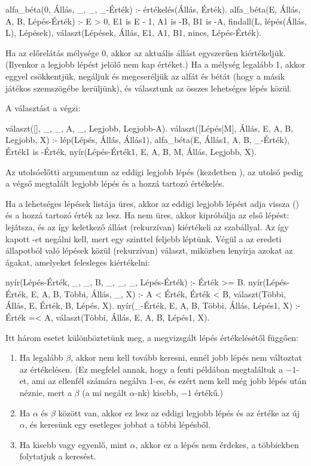 \begin{program}
alfa_béta(0, Állás, _, _, _-Érték) :-
    értékelés(Állás, Érték).
alfa_béta(E, Állás, A, B, Lépés-Érték) :-
    E > 0, E1 is E - 1,
    A1 is -B, B1 is -A,
    findall(L, lépés(Állás, L), Lépések),
    választ(Lépések, Állás, E1, A1, B1,
            nincs, Lépés-Érték).
\end{program}

Ha az előrelátás mélysége 0, akkor az aktuális
állást egyszerűen kiértékeljük. (Ilyenkor a legjobb
lépést jelölő  nem kap értéket.) Ha a
mélység legalább 1, akkor eggyel csökkentjük,
negáljuk és megcseréljük az alfát és bétát (hogy a
másik játékos szemszögébe kerüljünk), és választunk
az összes lehetséges lépés közül.

A választást a  végzi:
\begin{program}
választ([], _, _, A, _, Legjobb, Legjobb-A).
választ([Lépés|M], Állás, E, A, B, Legjobb, X) :-
    lép(Lépés, Állás, Állás1),
    alfa_béta(E, Állás1, A, B, _-Érték),
    Érték1 is -Érték,
    nyír(Lépés-Érték1, E, A, B, M, Állás,
         Legjobb, X).
\end{program}

Az utolsóelőtti argumentum az eddigi legjobb lépés
(kezdetben ), az utolsó pedig a végső
megtalált legjobb lépés és a hozzá tartozó
értékelés.

Ha a lehetséges lépések listája üres, akkor az
eddigi legjobb lépést adja vissza () és
a hozzá tartozó érték az  lesz. Ha nem
üres, akkor kipróbálja az első lépést: lejátsza, és
az így keletkező állást (rekurzívan) kiértékeli az
 szabállyal. Az így kapott
-et negálni kell, mert egy szinttel
feljebb léptünk. Végül a  az eredeti
 állapotból való lépések közül
(rekurzívan) választ, miközben lenyírja azokat az
ágakat, amelyeket felesleges kiértékelni:
\begin{program}
nyír(Lépés-Érték, _, _, B, _, _, _, Lépés-Érték) :-
    Érték >= B.
nyír(Lépés-Érték, E, A, B, Többi, Állás, _, X) :-
    A < Érték, Érték < B,
    választ(Többi, Állás, E, Érték, B, Lépés, X).
nyír(_-Érték, E, A, B, Többi, Állás, Lépés1, X) :-
    Érték =< A,
    választ(Többi, Állás, E, A, B, Lépés1, X).
\end{program}

Itt három esetet különböztetünk meg, a megvizsgált
lépés értékelésétől függően:
\begin{enumerate}
\item Ha legalább $\beta$, akkor nem kell tovább
  keresni, ennél jobb lépés nem változtat az
  értékelésen. (Ez megfelel annak, hogy a fenti
  példában megtaláltuk a $-1$-et, ami az ellenfél
  számára negálva 1-es, és ezért nem kell még jobb
  lépés után néznie, mert a $\beta$ (a mi negált
  $\alpha$-nk) kisebb, $-1$ értékű.)
\item Ha $\alpha$ és $\beta$ között van, akkor ez
  lesz az eddigi legjobb lépés és az értéke az új
  $\alpha$, és keresünk egy esetleges jobbat a többi
  lépésből.
\item Ha kisebb vagy egyenlő, mint $\alpha$, akkor
  ez a lépés nem érdekes, a többiekben folytatjuk a
  keresést.
\end{enumerate}

